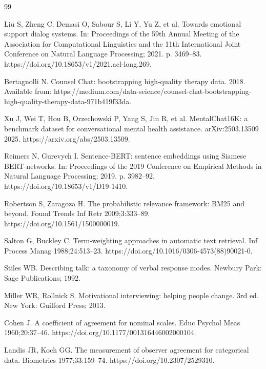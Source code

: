 \documentclass[preprint,12pt,a4paper]{elsarticle}
\begin{document}

\begin{thebibliography}{99}

Liu S, Zheng C, Demasi O, Sabour S, Li Y, Yu Z, et al. Towards emotional support dialog systems. In: Proceedings of the 59th Annual Meeting of the Association for Computational Linguistics and the 11th International Joint Conference on Natural Language Processing; 2021. p. 3469--83. https://doi.org/10.18653/v1/2021.acl-long.269.

Bertagnolli N. Counsel Chat: bootstrapping high-quality therapy data. 2018. Available from: https://medium.com/data-science/counsel-chat-bootstrapping-high-quality-therapy-data-971b419f33da.

Xu J, Wei T, Hou B, Orzechowski P, Yang S, Jin R, et al. MentalChat16K: a benchmark dataset for conversational mental health assistance. arXiv:2503.13509 2025. https://arxiv.org/abs/2503.13509.

Reimers N, Gurevych I. Sentence-BERT: sentence embeddings using Siamese BERT-networks. In: Proceedings of the 2019 Conference on Empirical Methods in Natural Language Processing; 2019. p. 3982--92. https://doi.org/10.18653/v1/D19-1410.

Robertson S, Zaragoza H. The probabilistic relevance framework: BM25 and beyond. Found Trends Inf Retr 2009;3:333--89. https://doi.org/10.1561/1500000019.

Salton G, Buckley C. Term-weighting approaches in automatic text retrieval. Inf Process Manag 1988;24:513--23. https://doi.org/10.1016/0306-4573(88)90021-0.

Stiles WB. Describing talk: a taxonomy of verbal response modes. Newbury Park: Sage Publications; 1992.

Miller WR, Rollnick S. Motivational interviewing: helping people change. 3rd ed. New York: Guilford Press; 2013.

Cohen J. A coefficient of agreement for nominal scales. Educ Psychol Meas 1960;20:37--46. https://doi.org/10.1177/001316446002000104.

Landis JR, Koch GG. The measurement of observer agreement for categorical data. Biometrics 1977;33:159--74. https://doi.org/10.2307/2529310.


\end{thebibliography}
\end{document}
